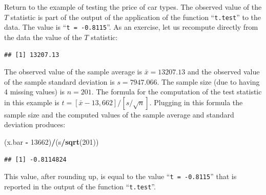 \documentclass[
]{krantz}
\makeatletter
\newenvironment{Shaded}{\begin{snugshade}}{\end{snugshade}}
\newcommand{\DataTypeTok}[1]{\textcolor[rgb]{0.13,0.29,0.53}{#1}}
\newcommand{\DecValTok}[1]{\textcolor[rgb]{0.00,0.00,0.81}{#1}}
\newcommand{\KeywordTok}[1]{\textcolor[rgb]{0.13,0.29,0.53}{\textbf{#1}}}
\newcommand{\NormalTok}[1]{#1}
\newcommand{\OperatorTok}[1]{\textcolor[rgb]{0.81,0.36,0.00}{\textbf{#1}}}
\newcommand{\OtherTok}[1]{\textcolor[rgb]{0.56,0.35,0.01}{#1}}
\newcommand{\StringTok}[1]{\textcolor[rgb]{0.31,0.60,0.02}{#1}}
\newenvironment{kframe}{%
\medskip{}
\setlength{\fboxsep}{.8em}
 \def\at@end@of@kframe{}%
 \ifinner\ifhmode%
  \def\at@end@of@kframe{\end{minipage}}%
  \begin{minipage}{\columnwidth}%
 \fi\fi%
 \def\FrameCommand##1{\hskip\@totalleftmargin \hskip-\fboxsep
 \colorbox{shadecolor}{##1}\hskip-\fboxsep
     \hskip-\linewidth \hskip-\@totalleftmargin \hskip\columnwidth}%
 \MakeFramed {\advance\hsize-\width
   \@totalleftmargin\z@ \linewidth\hsize
   \@setminipage}}%
 {\par\unskip\endMakeFramed%
 \at@end@of@kframe}
\renewenvironment{Shaded}{\begin{kframe}}{\end{kframe}}
\theoremstyle{definition}
\theoremstyle{definition}
\theoremstyle{definition}
\theoremstyle{remark}
\makeatother
\begin{document}
Return to the example of testing the price of car types. The observed
value of the \(T\) statistic is part of the output of the application of
the function ``\texttt{t.test}'' to the data. The value is ``\texttt{t\ =\ -0.8115}''. As an
exercise, let us recompute directly from the data the value of the \(T\)
statistic:

\begin{Shaded}
\end{Shaded}

\begin{verbatim}
## [1] 13207.13
\end{verbatim}

\begin{Shaded}
\end{Shaded}

The observed value of the sample average is \(\bar x = 13207.13\) and the
observed value of the sample standard deviation is \(s = 7947.066\). The
sample size (due to having 4 missing values) is \(n=201\). The formula for
the computation of the test statistic in this example is
\(t = [\bar x - 13,662]/[s/\sqrt{n}]\). Plugging in this formula the
sample size and the computed values of the sample average and standard
deviation produces:

\begin{Shaded}
\begin{Highlighting}[]
\NormalTok{(x.bar }\OperatorTok{-}\StringTok{ }\DecValTok{13662}\NormalTok{)}\OperatorTok{/}\NormalTok{(s}\OperatorTok{/}\KeywordTok{sqrt}\NormalTok{(}\DecValTok{201}\NormalTok{))}
\end{Highlighting}
\end{Shaded}

\begin{verbatim}
## [1] -0.8114824
\end{verbatim}

This value, after rounding up, is equal to the value ``\texttt{t\ =\ -0.8115}''
that is reported in the output of the function ``\texttt{t.test}''.
\end{document}
